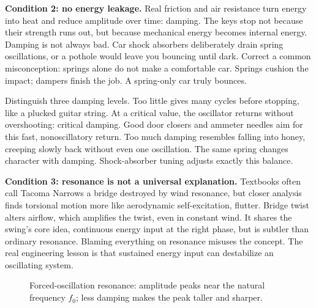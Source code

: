 \textbf{Condition 2: no energy leakage.} Real friction and air resistance turn energy into heat and reduce amplitude over time: damping. The keys stop not because their strength runs out, but because mechanical energy becomes internal energy. Damping is not always bad. Car shock absorbers deliberately drain spring oscillations, or a pothole would leave you bouncing until dark. Correct a common misconception: springs alone do not make a comfortable car. Springs cushion the impact; dampers finish the job. A spring-only car truly bounces.

Distinguish three damping levels. Too little gives many cycles before stopping, like a plucked guitar string. At a critical value, the oscillator returns without overshooting: critical damping. Good door closers and ammeter needles aim for this fast, nonoscillatory return. Too much damping resembles falling into honey, creeping slowly back without even one oscillation. The same spring changes character with damping. Shock-absorber tuning adjusts exactly this balance.

\textbf{Condition 3: resonance is not a universal explanation.} Textbooks often call Tacoma Narrows a bridge destroyed by wind resonance, but closer analysis finds torsional motion more like aerodynamic self-excitation, flutter. Bridge twist alters airflow, which amplifies the twist, even in constant wind. It shares the swing's core idea, continuous energy input at the right phase, but is subtler than ordinary resonance. Blaming everything on resonance misuses the concept. The real engineering lesson is that sustained energy input can destabilize an oscillating system.

\begin{figure}[htbp]
\centering
{}
\caption{Forced-oscillation resonance: amplitude peaks near the natural frequency \(f_0\); less damping makes the peak taller and sharper.}
\end{figure}


